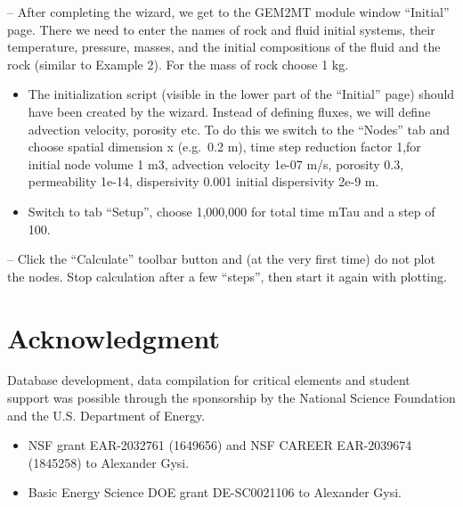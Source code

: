 \documentclass[
]{book}
\providecommand{\tightlist}{%
  \setlength{\itemsep}{0pt}\setlength{\parskip}{0pt}}
\begin{document}
-- After completing the wizard, we get to the GEM2MT module window ``Initial'' page. There we need to enter the names of rock and fluid initial systems, their temperature, pressure, masses, and the initial compositions of the fluid and the rock (similar to Example 2). For the mass of rock choose 1 kg.

\begin{itemize}
\item
  The initialization script (visible in the lower part of the ``Initial'' page) should have been created by the wizard. Instead of defining fluxes, we will define advection velocity, porosity etc. To do this we switch to the ``Nodes'' tab and choose spatial dimension x (e.g.~0.2 m), time step reduction factor 1,for initial node volume 1 m3, advection velocity 1e-07 m/s, porosity 0.3, permeability 1e-14, dispersivity 0.001 initial dispersivity 2e-9 m.
\item
  Switch to tab ``Setup'', choose 1,000,000 for total time mTau and a step of 100.
\end{itemize}

-- Click the ``Calculate'' toolbar button and (at the very first time) do not plot the nodes. Stop calculation after a few ``steps'', then start it again with plotting.

\hypertarget{acknowledgment}{%
\chapter*{Acknowledgment}\label{acknowledgment}}

Database development, data compilation for critical elements and student support was possible through the sponsorship by the National Science Foundation and the U.S. Department of Energy.

\begin{itemize}
\tightlist
\item
  NSF grant EAR-2032761 (1649656) and NSF CAREER EAR-2039674 (1845258) to Alexander Gysi.
\item
  Basic Energy Science DOE grant DE-SC0021106 to Alexander Gysi.
\end{itemize}

  
\end{document}
